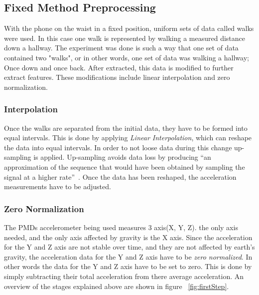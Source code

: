 \documentclass{sig-alternate}
\begin{document}
\subsection{Fixed Method Preprocessing}	
	With the phone on the waist in a fixed position, uniform sets of data called walks were used. In this case one walk is represented by walking a measured distance down a hallway. The experiment was done is such a way that one set of data contained two "walks", or in other words, one set of data was walking a hallway; Once down and once back. After extracted, this data is modified to further extract features. These modifications include linear interpolation and zero normalization. 
\subsubsection{Interpolation} 
	Once the walks are separated from the initial data, they have to be formed into equal intervals. This is done by applying \textit{Linear Interpolation}, which can reshape the data  into equal intervals. In order to not loose data during this change up-sampling is applied. Up-sampling avoids data loss by producing ``an approximation of the sequence that would have been obtained by sampling the signal at a higher rate''~\cite{wiki1:2014}. Once the data has been reshaped, the acceleration measurements have to be adjusted. 
\subsubsection{Zero Normalization}
	The PMDs accelerometer being used measures 3 axis(X, Y, Z). the only axis needed, and the only axis affected by gravity is the X axis. Since the acceleration for the Y and Z axis are not stable over time, and they are not affected by earth's gravity, the acceleration data for the Y and Z axis have to be \textit{zero normalized}. In other words the data for the Y and Z axis have to be set to zero. This is done by simply subtracting their total acceleration from there average acceleration. An overview of the stages explained above are shown in figure ~\ref{fig:firstStep}.
\end{document}
